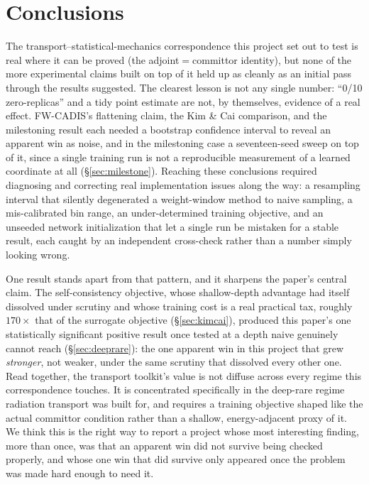 \documentclass[a4paper,fleqn]{cas-sc}
\begin{document}
	\FloatBarrier
	
	\section{Conclusions}\label{sec:conclusions}
	The transport--statistical-mechanics correspondence this project set out to test is real
	where it can be proved (the adjoint$=$committor identity), but none of the more
	experimental claims built on top of it held up as cleanly as an initial pass through the
	results suggested. The clearest lesson is not any single number: ``0/10 zero-replicas''
	and a tidy point estimate are not, by themselves, evidence of a real effect. FW-CADIS's
	flattening claim, the Kim \& Cai comparison, and the milestoning result each needed a
	bootstrap confidence interval to reveal an apparent win as noise, and in the milestoning
	case a seventeen-seed sweep on top of it, since a single training run is not a
	reproducible measurement of a learned coordinate at all
	(\S\ref{sec:milestone}). Reaching these conclusions required
	diagnosing and correcting real implementation issues along the way: a resampling
	interval that silently degenerated a weight-window method to naive sampling, a
	mis-calibrated bin range, an under-determined training objective, and an unseeded
	network initialization that let a single run be mistaken for a stable result, each
	caught by an independent cross-check rather than a number simply looking wrong.
	
	One result stands apart from that pattern, and it sharpens the paper's central
	claim. The self-consistency objective, whose shallow-depth
	advantage had itself dissolved under scrutiny and whose training cost is a real practical
	tax, roughly $170\times$ that of the surrogate objective (\S\ref{sec:kimcai}), produced this paper's
	one statistically significant positive result once tested at a depth naive genuinely
	cannot reach (\S\ref{sec:deeprare}): the one apparent win in this project that grew
	\emph{stronger}, not weaker, under the same scrutiny that dissolved every other one. Read
	together, the transport toolkit's value is not diffuse across every regime this
	correspondence touches. It is concentrated specifically in the deep-rare regime radiation
	transport was built for, and requires a training objective shaped like the actual
	committor condition rather than a shallow, energy-adjacent proxy of it. We think this is
	the right way to report a project whose most interesting finding, more than once, was
	that an apparent win did not survive being checked properly, and whose one win that did
	survive only appeared once the problem was made hard enough to need it.
	
\end{document}

